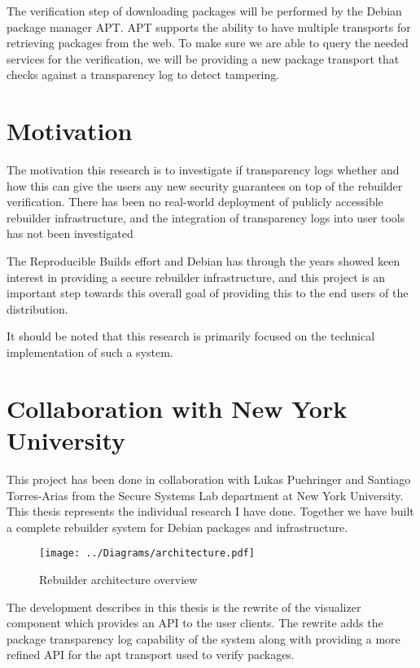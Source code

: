 \documentclass[../Main/thesis.tex]{subfiles}
\begin{document}
The verification step of downloading packages will be performed by the Debian
package manager APT. APT supports the ability to have multiple transports for
retrieving packages from the web. To make sure we are able to query the needed
services for the verification, we will be providing a new package transport that
checks against a transparency log to detect tampering.

\section{Motivation}\label{sec:motivation}
The motivation this research is to investigate if transparency logs whether and
how this can give the users any new security guarantees on top of the rebuilder
verification. There has been no real-world deployment of publicly accessible
rebuilder infrastructure, and the integration of transparency logs into user
tools has not been investigated 

The Reproducible Builds effort and Debian has through the years showed keen
interest in providing a secure rebuilder infrastructure, and this project is
an important step towards this overall goal of providing this to the end users
of the distribution.

It should be noted that this research is primarily focused on the technical
implementation of such a system.

\section{Collaboration with New York University}\label{sec:collab}
This project has been done in collaboration with Lukas Puehringer and Santiago
Torres-Arias from the Secure Systems Lab department at New York University. This
thesis represents the individual research I have done. Together we have built a
complete rebuilder system for Debian packages and infrastructure. 

\begin{figure}[H]
\centering
\texttt{[image: ../Diagrams/architecture.pdf]}
\caption{Rebuilder architecture overview}
\label{fig:rebuilder_architecture}
\end{figure}

The development describes in this thesis is the rewrite of the visualizer
component which provides an API to the user clients. The rewrite adds the
package transparency log capability of the system along with providing a more
refined API for the apt transport used to verify packages.
\end{document}
